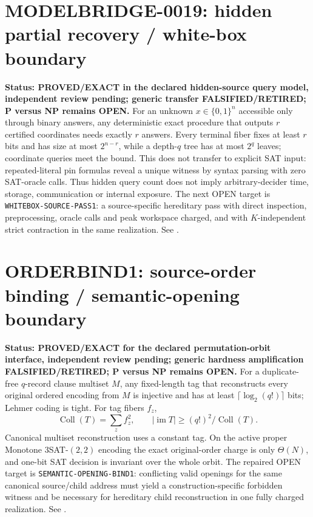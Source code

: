 \documentclass[11pt]{article}
\begin{document}
\section{MODELBRIDGE-0019: hidden partial recovery / white-box boundary}
\textbf{Status: PROVED/EXACT in the declared hidden-source query model, independent review pending; generic transfer FALSIFIED/RETIRED; P versus NP remains OPEN.}
For an unknown $x\in\{0,1\}^n$ accessible only through binary answers, any deterministic exact procedure that outputs $r$ certified coordinates needs exactly $r$ answers. Every terminal fiber fixes at least $r$ bits and has size at most $2^{n-r}$, while a depth-$q$ tree has at most $2^q$ leaves; coordinate queries meet the bound. This does not transfer to explicit SAT input: repeated-literal pin formulas reveal a unique witness by syntax parsing with zero SAT-oracle calls. Thus hidden query count does not imply arbitrary-decider time, storage, communication or internal exposure. The next OPEN target is \texttt{WHITEBOX-SOURCE-PASS1}: a source-specific hereditary pass with direct inspection, preprocessing, oracle calls and peak workspace charged, and with $K$-independent strict contraction in the same realization. See .


\section{ORDERBIND1: source-order binding / semantic-opening boundary}
\textbf{Status: PROVED/EXACT for the declared permutation-orbit interface,
independent review pending; generic hardness amplification
FALSIFIED/RETIRED; P versus NP remains OPEN.}
For a duplicate-free \(q\)-record clause multiset \(M\), any fixed-length tag
that reconstructs every original ordered encoding from \(M\) is injective and
has at least \(\lceil\log_2(q!)\rceil\) bits; Lehmer coding is tight.  For tag
fibers \(f_z\),
\[
 \operatorname{Coll}(T)=\sum_z f_z^2,\qquad
 |\operatorname{im}T|\ge (q!)^2/\operatorname{Coll}(T).
\]
Canonical multiset reconstruction uses a constant tag.  On the active proper
Monotone \(3\)SAT-\((2,2)\) encoding the exact original-order charge is only
\(\Theta(N)\), and one-bit SAT decision is invariant over the whole orbit.
The repaired OPEN target is \texttt{SEMANTIC-OPENING-BIND1}: conflicting
valid openings for the same canonical source/child address must yield a
construction-specific forbidden witness and be necessary for hereditary
child reconstruction in one fully charged realization.  See
.



\end{document}
